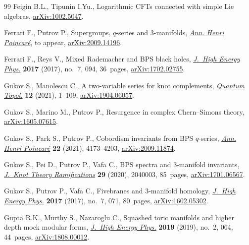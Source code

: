 \begin{thebibliography}{99}
Feigin B.L., Tipunin I.Yu., Logarithmic {CFT}s connected with simple {L}ie
 algebras, \href{https://arxiv.org/abs/1002.5047}{arXiv:1002.5047}.

Ferrari F., Putrov P., Supergroups, $q$-series and 3-manifolds, \href{https://doi.org/10.1007/s00023-023-01380-4}{\textit{Ann.
 Henri Poincar\'e}}, {t}o appear, \href{https://arxiv.org/abs/2009.14196}{arXiv:2009.14196}.

Ferrari F., Reys V., Mixed {R}ademacher and {BPS} black holes, \href{https://doi.org/10.1007/JHEP07(2017)094}{\textit{J.~High
 Energy Phys.}} \textbf{2017} (2017), no.~7, 094, 36~pages,
 \href{https://arxiv.org/abs/1702.02755}{arXiv:1702.02755}.

Gukov S., Manolescu C., A two-variable series for knot complements,
 \href{https://doi.org/10.4171/qt/145}{\textit{Quantum Topol.}} \textbf{12} (2021), 1--109, \href{https://arxiv.org/abs/1904.06057}{arXiv:1904.06057}.

Gukov S., Marino M., Putrov P., Resurgence in complex {C}hern--{S}imons theory,
 \href{https://arxiv.org/abs/1605.07615}{arXiv:1605.07615}.

Gukov S., Park S., Putrov P., Cobordism invariants from {BPS} {$q$}-series,
 \href{https://doi.org/10.1007/s00023-021-01089-2}{\textit{Ann. Henri Poincar\'e}} \textbf{22} (2021), 4173--4203,
 \href{https://arxiv.org/abs/2009.11874}{arXiv:2009.11874}.

Gukov S., Pei D., Putrov P., Vafa C., B{PS} spectra and 3-manifold invariants,
 \href{https://doi.org/10.1142/S0218216520400039}{\textit{J.~Knot Theory Ramifications}} \textbf{29} (2020), 2040003, 85~pages,
 \href{https://arxiv.org/abs/1701.06567}{arXiv:1701.06567}.

Gukov S., Putrov P., Vafa C., Fivebranes and 3-manifold homology,
 \href{https://doi.org/10.1007/JHEP07(2017)071}{\textit{J.~High Energy Phys.}} \textbf{2017} (2017), no.~7, 071, 80~pages,
 \href{https://arxiv.org/abs/1602.05302}{arXiv:1602.05302}.

Gupta R.K., Murthy S., Nazaroglu C., Squashed toric manifolds and higher depth
 mock modular forms, \href{https://doi.org/10.1007/jhep02(2019)064}{\textit{J.~High Energy Phys.}} \textbf{2019} (2019),
 no.~2, 064, 44~pages, \href{https://arxiv.org/abs/1808.00012}{arXiv:1808.00012}.


\end{thebibliography}
